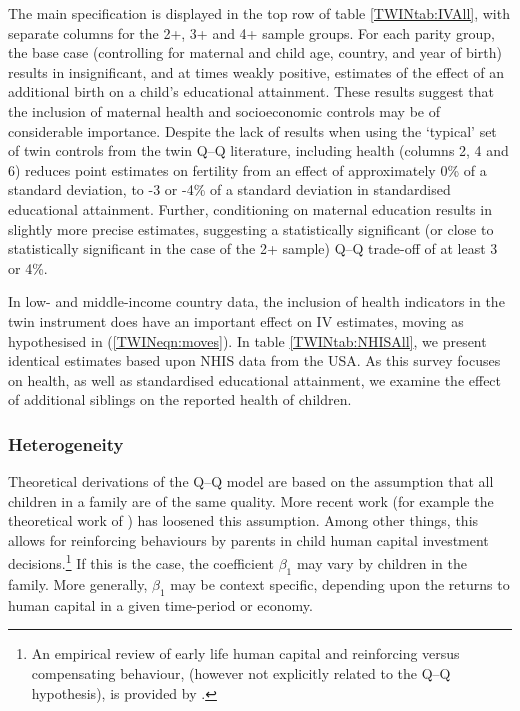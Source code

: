 \documentclass[subeqn]{article}
\begin{document}
\begin{spacing}{1.4}
The main specification is displayed in the top row of table \ref{TWINtab:IVAll}, 
with separate columns for the 2+, 3+ and 4+ sample groups. For each parity 
group, the base case (controlling for maternal and child age, country, and year 
of birth) results in insignificant, and at times weakly positive, estimates of 
the effect of an additional birth on a child's educational attainment. These 
results suggest that the inclusion of maternal health and socioeconomic controls 
may be of considerable importance. Despite the lack of results when using
the `typical' set of twin controls from the twin Q--Q literature, including 
health (columns 2, 4 and 6) reduces point estimates on fertility from an effect 
of approximately 0\% of a standard deviation, to -3 or -4\% of a standard 
deviation in standardised educational attainment. Further, conditioning on 
maternal education results in slightly more precise estimates, suggesting a 
statistically significant (or close to statistically significant in the case
of the 2+ sample) Q--Q trade-off of at least 3 or 4\%.

In low- and middle-income country data, the inclusion of health indicators in 
the twin instrument does have an important effect on IV estimates, moving as
hypothesised in (\ref{TWINeqn:moves}).  In table \ref{TWINtab:NHISAll}, we 
present identical estimates based upon NHIS data from the USA.  As this survey
focuses on health, as well as standardised educational attainment, we examine
the effect of additional siblings on the reported health of children.

\subsubsection{Heterogeneity}
Theoretical derivations of the Q--Q model are based on the assumption that all
children in a family are of the same quality. More recent work (for example the 
theoretical work of \citet{AizerCunha2012}) has loosened this assumption. Among 
other things, this allows for reinforcing behaviours by parents in child human 
capital investment decisions.\footnote{An empirical review of early life human 
capital and reinforcing versus compensating behaviour, (however not explicitly 
related to the Q--Q hypothesis), is provided by \citet{AlmondMazumder2013}.} If 
this is the case, the coefficient $\beta_1$ may vary by children in the family. 
More generally, $\beta_1$ may be context specific, depending upon the returns to 
human capital in a given time-period or economy.


\end{spacing}
\end{document}
